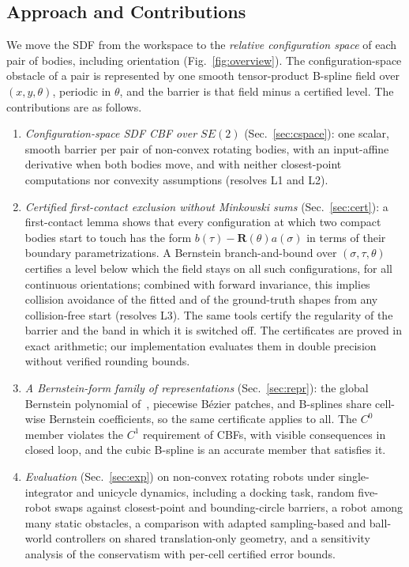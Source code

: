 \documentclass[journal]{IEEEtran}
\theoremstyle{definition}
\newcommand{\Rot}{\mathbf{R}}
\begin{document}
\subsection{Approach and Contributions}
We move the SDF from the workspace to the \emph{relative configuration space} of each pair of
bodies, including orientation (Fig.~\ref{fig:overview}). The configuration-space obstacle of a
pair is represented by one smooth tensor-product B-spline field over $(x,y,\theta)$, periodic in
$\theta$, and the barrier is that field minus a certified level. The contributions are as follows.
\begin{enumerate}
\item \emph{Configuration-space SDF CBF over $SE(2)$} (Sec.~\ref{sec:cspace}): one scalar, smooth
barrier per pair of non-convex rotating bodies, with an input-affine derivative when both bodies
move, and with neither closest-point computations nor convexity assumptions (resolves L1 and L2).
\item \emph{Certified first-contact exclusion without Minkowski sums} (Sec.~\ref{sec:cert}): a
first-contact lemma shows that every configuration at which two compact bodies start to touch has
the form $b(\tau)-\Rot(\theta)a(\sigma)$ in terms of their boundary parametrizations. A Bernstein
branch-and-bound over $(\sigma,\tau,\theta)$ certifies a level below which the field stays on all
such configurations, for all continuous orientations; combined with forward invariance, this
implies collision avoidance of the fitted and of the ground-truth shapes from any collision-free
start (resolves L3). The same tools certify the regularity of the barrier and the band in which it
is switched off. The certificates are proved in exact arithmetic; our implementation evaluates them
in double precision without verified rounding bounds.
\item \emph{A Bernstein-form family of representations} (Sec.~\ref{sec:repr}): the global Bernstein
polynomial of~\cite{jo2026geometry}, piecewise B\'ezier patches, and B-splines share cell-wise
Bernstein coefficients, so the same certificate applies to all. The $C^0$ member violates the $C^1$
requirement of CBFs, with visible consequences in closed loop, and the cubic B-spline is an accurate
member that satisfies it.
\item \emph{Evaluation} (Sec.~\ref{sec:exp}) on non-convex rotating robots under single-integrator
and unicycle dynamics, including a docking task, random five-robot swaps against closest-point and
bounding-circle barriers, a robot among many static obstacles, a comparison with adapted
sampling-based and ball-world controllers on shared translation-only geometry, and a sensitivity
analysis of the conservatism with per-cell certified error bounds.
\end{enumerate}
\end{document}
